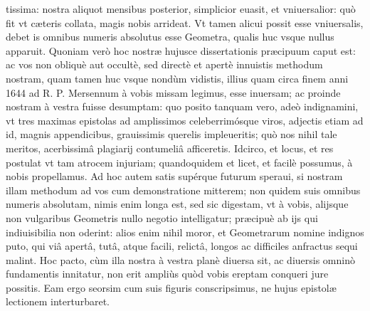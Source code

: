 \documentclass[11pt,a4paper]{article}
\begin{document}

tissima: nostra aliquot mensibus posterior, simplicior euasit, et vniuersalior: quò fit vt cæteris collata, magis nobis arrideat. Vt tamen alicui possit esse vniuersalis, debet is omnibus numeris absolutus esse Geometra, qualis huc vsque nullus apparuit. Quoniam verò hoc nostræ hujusce dissertationis præcipuum caput est: ac vos non obliquè aut occultè, sed directè et apertè innuistis methodum nostram, quam tamen huc vsque nondùm vidistis, illius quam circa finem anni 1644 ad R. P. Mersennum à vobis missam legimus, esse inuersam; ac proinde nostram à vestra fuisse desumptam: quo posito tanquam vero, adeò indignamini, vt tres maximas epistolas ad amplissimos celeberrimósque viros, adjectis etiam ad id, magnis appendicibus, grauissimis querelis impleueritis; quò nos nihil tale meritos, acerbissimâ plagiarij contumeliâ afficeretis. Idcirco, et locus, et res postulat vt tam atrocem injuriam; quandoquidem et licet, et facilè possumus, à nobis propellamus. Ad hoc autem satis supérque futurum speraui, si nostram illam methodum ad vos cum demonstratione mitterem; non quidem suis omnibus numeris absolutam, nimis enim longa est, sed sic digestam, vt à vobis, alijsque non vulgaribus Geometris nullo negotio intelligatur; præcipuè ab ijs qui indiuisibilia non oderint: alios enim nihil moror, et Geometrarum nomine indignos puto, qui viâ apertâ, tutâ, atque facili, relictâ, longos ac difficiles anfractus sequi malint. Hoc pacto, cùm illa nostra à vestra planè diuersa sit, ac diuersis omninò fundamentis innitatur, non erit ampliùs quòd vobis ereptam conqueri jure possitis. Eam ergo seorsim cum suis figuris conscripsimus, ne hujus epistolæ lectionem interturbaret.
\end{document}
